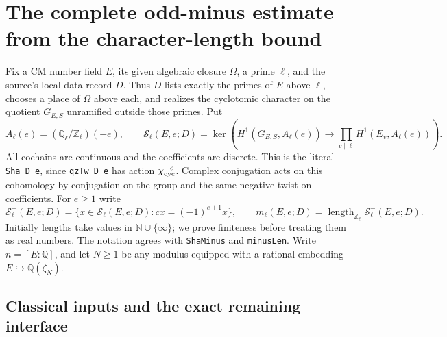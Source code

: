 \section{The complete odd-minus estimate from the character-length bound}
\label{sec:odd-minus-bounds}


Fix a CM number field $E$, its given algebraic closure $\Omega$, a
prime $\ell$, and the source's local-data record $D$.  Thus $D$ lists
exactly the primes of $E$ above $\ell$, chooses a place of $\Omega$
above each, and realizes the cyclotomic character on the quotient
$G_{E,S}$ unramified outside those primes.  Put
\[
 A_\ell(e)=(\mathbb Q_\ell/\mathbb Z_\ell)(-e),\qquad
 \mathcal S_\ell(E,e;D)
 =\ker\!\left(H^1(G_{E,S},A_\ell(e))
       \longrightarrow\prod_{v\mid\ell}H^1(E_v,A_\ell(e))\right).
 \tag{OB.1}
\]
All cochains are continuous and the coefficients are discrete.  This is
the literal \texttt{Sha D e}, since \texttt{qzTw D e} has action
$\chi_{\rm cyc}^{-e}$.  Complex conjugation acts on this cohomology by
conjugation on the group and the same negative twist on coefficients.
For $e\ge1$ write
\[
 \mathcal S_\ell^-(E,e;D)
 =\{x\in\mathcal S_\ell(E,e;D):cx=(-1)^{e+1}x\},\qquad
 m_\ell(E,e;D)=\operatorname{length}_{\mathbb Z_\ell}
                       \mathcal S_\ell^-(E,e;D).
 \tag{OB.2}
\]
Initially lengths take values in $\mathbb N\cup\{\infty\}$; we prove
finiteness before treating them as real numbers.  The notation agrees
with \texttt{ShaMinus} and \texttt{minusLen}.  Write $n=[E:\mathbb Q]$,
and let $N\ge1$ be any modulus equipped with a rational embedding
$E\hookrightarrow\mathbb Q(\zeta_N)$.

\subsection{Classical inputs and the exact remaining interface}
\label{sec:ob-classical}

